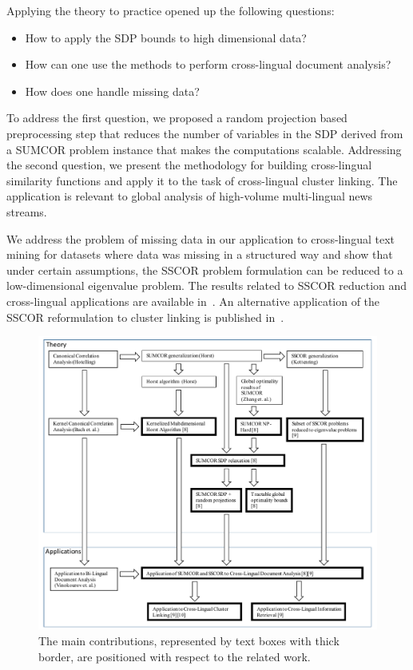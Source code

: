 Applying the theory to practice opened up the following questions:
\begin{itemize}
\item How to apply the SDP bounds to high dimensional data?
\item How can one use the methods to perform cross-lingual document analysis?
\item How does one handle missing data?
\end{itemize}
To address the first question, we proposed a random projection based preprocessing step that reduces the number
of variables in the SDP derived from a SUMCOR problem instance that makes the computations scalable. Addressing
the second question, we present the methodology for building cross-lingual similarity functions and apply it
to the task of cross-lingual cluster linking. The application is relevant to global analysis of high-volume
multi-lingual news streams.

We address the problem of missing data in our application to cross-lingual text mining for datasets where
data was missing in a structured way and show that under certain assumptions, the SSCOR problem formulation
can be reduced to a low-dimensional eigenvalue problem. The results related to SSCOR reduction and
cross-lingual applications are available in~\cite{rupnikJAIR}.
An alternative application of the SSCOR reformulation to cluster linking is published in~\cite{Belyaeva201564}.

\begin{figure}[t]
\centering
\includegraphics[width=1\textwidth]{figures/position_of_work.pdf}
\caption[The main contributions and related work]{The main contributions, represented by text boxes with thick border, are
positioned with respect to the related work.}
\label{fig:position_of_work}
\end{figure}

